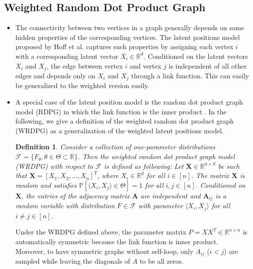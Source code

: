 \documentclass[a4paper]{article}
\newtheorem{definition}[fact]{Definition}
\begin{document}
\subsection{Weighted Random Dot Product Graph}
\label{section:WRDPG}
\begin{itemize}
\item The connectivity between two vertices in a graph generally depends on some hidden properties of the corresponding vertices. The latent positions model proposed by Hoff et al. \cite{hoff2002latent} captures such properties by assigning each vertex $i$ with a corresponding latent vector $X_i \in \mathbb{R}^d$. Conditioned on the latent vectors $X_i$ and $X_j$, the edge between vertex $i$ and vertex $j$ is independent of all other edges and depends only on $X_i$ and $X_j$ through a link function. This can easily be generalized to the weighted version easily.
\item A special case of the latent position model is the random dot product graph model (RDPG) in which the link function is the inner product \cite{young2007random, nickel2007random}. In the following, we give a definition of the weighted random dot product graph (WRDPG) as a generalization of the weighted latent positions model.
\begin{definition}
Consider a collection of one-parameter distributions $\mathcal{F} = \{ F_{\theta}, \theta \in \Theta \subset \mathbb{R} \}$. Then the weighted random dot product graph model (WRDPG) with respect to $\mathcal{F}$ is defined as following: Let $\boldsymbol{X} \in \mathbb{R}^{n \times d}$ be such that $\boldsymbol{X} = [X_1, X_2, \dotsc, X_n]^T$, where $X_i \in \mathbb{R}^d$ for all $i \in [n]$. The matrix $\boldsymbol{X}$ is random and satisfies $\mathbb{P}\left[ \langle X_i, X_j \rangle \in \Theta \right] = 1$ for all $i, j \in [n]$. Conditioned on $\boldsymbol{X}$, the entries of the adjacency matrix $\boldsymbol{A}$ are independent and $\boldsymbol{A}_{ij}$ is a random variable with distribution $F \in \mathcal{F}$ with parameter $\langle X_i, X_j \rangle$ for all $i \ne j \in [n]$.
\end{definition}
Under the WRDPG defined above, the parameter matrix $P = X X^T \in \mathbb{R}^{n \times n}$ is automatically symmetric because the link function is inner product. Moreover, to have symmetric graphs without self-loop, only $A_{ij}$ ($i < j$) are sampled while leaving the diagonals of $A$ to be all zeros.


\end{itemize}
\end{document}
